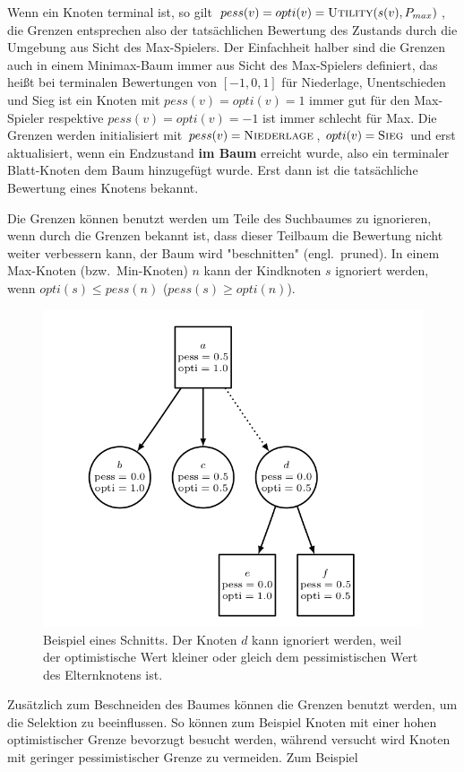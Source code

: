 Wenn ein Knoten terminal ist, so gilt $pess(v) = opti(v) = \textsc{Utility}(s(v),P_{max})$, die Grenzen entsprechen also der tatsächlichen Bewertung des Zustands durch die Umgebung aus Sicht des Max-Spielers. Der Einfachheit halber sind die Grenzen auch in einem Minimax-Baum immer aus Sicht des Max-Spielers definiert, das heißt bei terminalen Bewertungen von $[-1, 0, 1]$ für Niederlage, Unentschieden und Sieg ist ein Knoten mit $pess(v) = opti(v) = 1$ immer gut für den Max-Spieler respektive $pess(v) = opti(v) = -1$ ist immer schlecht für Max. Die Grenzen werden initialisiert mit $pess(v) = \textsc{Niederlage}$, $opti(v) = \textsc{Sieg}$ und erst aktualisiert, wenn ein Endzustand \textbf{im Baum} erreicht wurde, also ein terminaler Blatt-Knoten dem Baum hinzugefügt wurde.
Erst dann ist die tatsächliche Bewertung eines Knotens bekannt.

Die Grenzen können benutzt werden um Teile des Suchbaumes zu ignorieren, wenn durch die Grenzen bekannt ist, dass dieser Teilbaum die Bewertung nicht weiter verbessern kann, der Baum wird "beschnitten" (engl.\ pruned).
In einem Max-Knoten (bzw.\ Min-Knoten) $n$ kann der Kindknoten $s$ ignoriert werden, wenn $opti(s) \le pess(n)$ ($pess(s) \ge opti(n)$).\autocite[\ppno~5]{cazenaveScoreBoundedMonteCarlo2011}

\pagebreak[4]
\begin{figure}
	\centering
	\includegraphics[width=0.7\linewidth]{scorebound_cut_big}
	\caption{Beispiel eines Schnitts. Der Knoten $d$ kann ignoriert werden, weil der optimistische Wert kleiner oder gleich dem pessimistischen Wert des Elternknotens ist.\footnotemark}
	\label{fig:scoreboundcut}
\end{figure}

Zusätzlich zum Beschneiden des Baumes können die Grenzen benutzt werden, um die Selektion zu beeinflussen.
So können zum Beispiel Knoten mit einer hohen optimistischer Grenze bevorzugt besucht werden, während versucht wird Knoten mit geringer pessimistischer Grenze zu vermeiden.
Zum Beispiel

